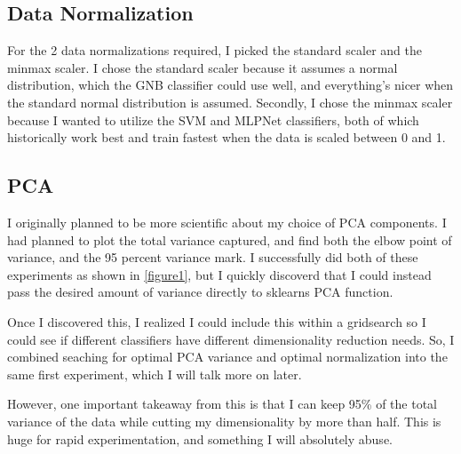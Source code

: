\documentclass[12pt]{article}
\begin{document}
\subsection{Data Normalization} 
For the 2 data normalizations required, I picked the standard scaler and the minmax scaler. I chose the standard scaler
because it assumes a normal distribution, which the GNB classifier could use well, and everything's nicer when the 
standard normal distribution is assumed. Secondly, I chose the minmax scaler because I wanted to utilize the SVM and 
MLPNet classifiers, both of which historically work best and train fastest when the data is scaled between 0 and 1.

\subsection{PCA}
I originally planned to be more scientific about my choice of PCA components. I had planned to plot the total 
variance captured, and find both the elbow point of variance, and the 95 percent variance mark. I successfully 
did both of these experiments as shown in \ref{figure1}, but I quickly discoverd that I could instead pass the 
desired amount of variance directly to sklearns PCA function. 

Once I discovered this, I realized I could include this within a gridsearch so I could see if different classifiers 
have different dimensionality reduction needs. So, I combined seaching for optimal PCA variance and optimal 
normalization into the same first experiment, which I will talk more on later. 

However, one important takeaway from this is that I can keep 95\% of the total variance of the data while cutting my 
dimensionality by more than half. This is huge for rapid experimentation, and something I will absolutely abuse.
\end{document}
